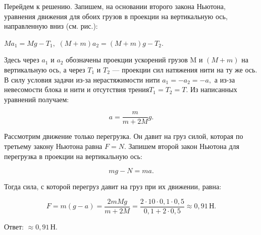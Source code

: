 \documentclass[12pt,a4paper]{article}
\begin{document}
{\begin{center}\end{center}
Перейдем к решению. Запишем, на основании второго закона Ньютона, уравнения движения для обоих грузов в проекции на вертикальную ось, направленную вниз (см. рис.):

$Ma_1=Mg - T_1,$ $( M + m ) a_2= ( M + m ) g - T_2.$

Здесь через $a_1$ и $a_2$ обозначены проекции ускорений грузов M и $( M + m )$ на вертикальную ось, а через $T_1$ и $T_2$  — проекции сил натяжения нити на ту же ось.
В силу условия задачи из-за нерастяжимости нити $a_1= - a_2= - a,$ а из-за невесомости блока и нити и отсутствия трения$T_1=T_2=T.$ 
Из написанных уравнений получаем: 

\[a= \frac{m}{m + 2M} g.\]

Рассмотрим движение только перегрузка. Он давит на груз силой, которая по третьему закону Ньютона равна $F=N.$ Запишем второй закон Ньютона для перегрузка в проекции на вертикальную ось:

\[mg - N=ma.\]

Тогда сила, с которой перегруз давит на груз при их движении, равна:

\[F=m ( g - a ) = \frac{2mMg}{m + 2M} = \frac{2 \cdot 10 \cdot 0{,}1 \cdot 0{,}5}{0{,}1 + 2 \cdot 0{,}5} \approx 0{,}91\,\text{Н}.\]

Ответ: $\approx 0{,}91\,\text{Н}.$
}
\end{document}
